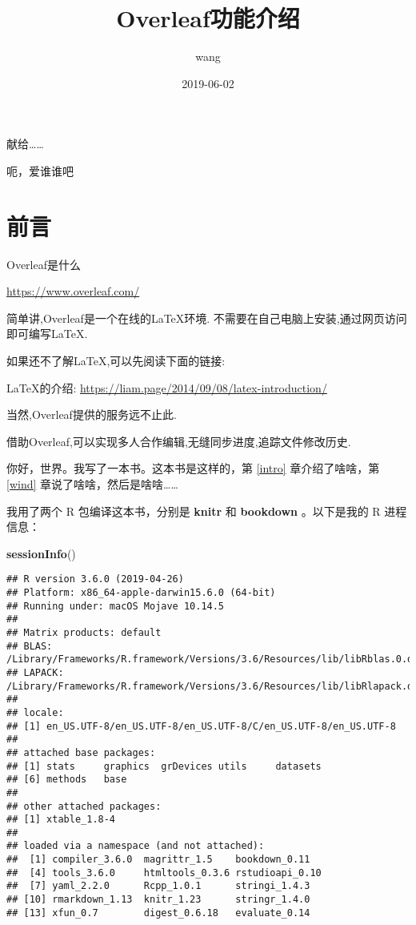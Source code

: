 \documentclass[]{ctexbook}
\title{Overleaf功能介绍}
\author{wang}
\date{2019-06-02}
\newenvironment{Shaded}{\begin{snugshade}}{\end{snugshade}}
\newcommand{\KeywordTok}[1]{\textcolor[rgb]{0.13,0.29,0.53}{\textbf{#1}}}
\newcommand{\NormalTok}[1]{#1}
\begin{document}
\maketitle


\thispagestyle{empty}

\begin{center}
献给……

呃，爱谁谁吧
\end{center}

\setlength{\abovedisplayskip}{-5pt}
\setlength{\abovedisplayshortskip}{-5pt}

{
\setcounter{tocdepth}{2}
\tableofcontents
}
\listoftables
\listoffigures
\hypertarget{section}{%
\chapter*{前言}\label{section}}


Overleaf是什么

\url{https://www.overleaf.com/}

简单讲,Overleaf是一个在线的LaTeX环境.
不需要在自己电脑上安装,通过网页访问即可编写LaTeX.

如果还不了解LaTeX,可以先阅读下面的链接:

LaTeX的介绍:
\url{https://liam.page/2014/09/08/latex-introduction/}

当然,Overleaf提供的服务远不止此.

借助Overleaf,可以实现多人合作编辑,无缝同步进度,追踪文件修改历史.

你好，世界。我写了一本书。这本书是这样的，第 \ref{intro} 章介绍了啥啥，第 \ref{wind} 章说了啥啥，然后是啥啥\ldots{}\ldots{}

我用了两个 R 包编译这本书，分别是 \textbf{knitr} \citep{xie2015} 和 \textbf{bookdown} \citep{R-bookdown}。以下是我的 R 进程信息：

\begin{Shaded}
\begin{Highlighting}[]
\KeywordTok{sessionInfo}\NormalTok{()}
\end{Highlighting}
\end{Shaded}

\begin{verbatim}
## R version 3.6.0 (2019-04-26)
## Platform: x86_64-apple-darwin15.6.0 (64-bit)
## Running under: macOS Mojave 10.14.5
## 
## Matrix products: default
## BLAS:   /Library/Frameworks/R.framework/Versions/3.6/Resources/lib/libRblas.0.dylib
## LAPACK: /Library/Frameworks/R.framework/Versions/3.6/Resources/lib/libRlapack.dylib
## 
## locale:
## [1] en_US.UTF-8/en_US.UTF-8/en_US.UTF-8/C/en_US.UTF-8/en_US.UTF-8
## 
## attached base packages:
## [1] stats     graphics  grDevices utils     datasets 
## [6] methods   base     
## 
## other attached packages:
## [1] xtable_1.8-4
## 
## loaded via a namespace (and not attached):
##  [1] compiler_3.6.0  magrittr_1.5    bookdown_0.11  
##  [4] tools_3.6.0     htmltools_0.3.6 rstudioapi_0.10
##  [7] yaml_2.2.0      Rcpp_1.0.1      stringi_1.4.3  
## [10] rmarkdown_1.13  knitr_1.23      stringr_1.4.0  
## [13] xfun_0.7        digest_0.6.18   evaluate_0.14
\end{verbatim}
\end{document}
